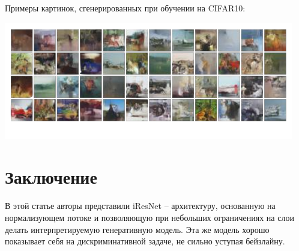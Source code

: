 \documentclass{article}
\begin{document}
Примеры картинок, сгенерированных при обучении на CIFAR10:

\includegraphics[scale=1.0]{gen_images.png}

\section{Заключение}

В этой статье авторы представили iResNet -- архитектуру, основанную на нормализующем потоке и позволяющую при небольших ограничениях на слои делать интерпретируемую генеративную модель. Эта же модель хорошо показывает себя на дискриминативной задаче, не сильно уступая бейзлайну.
\end{document}
